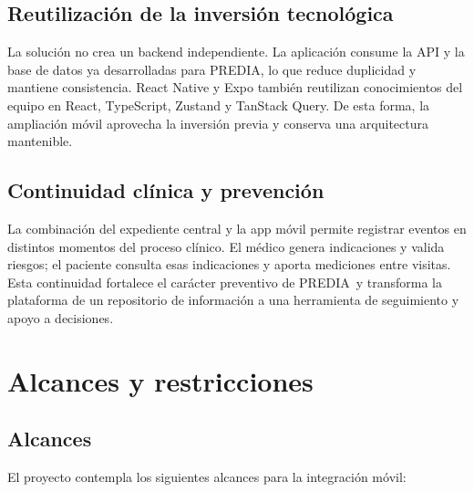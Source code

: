\documentclass[12pt,letterpaper]{report}
\newcommand{\projectname}{PREDIA}
\begin{document}
\subsection{Reutilización de la inversión tecnológica}

La solución no crea un backend independiente. La aplicación consume la API y la base de datos ya desarrolladas para \projectname, lo que reduce duplicidad y mantiene consistencia. React Native y Expo también reutilizan conocimientos del equipo en React, TypeScript, Zustand y TanStack Query. De esta forma, la ampliación móvil aprovecha la inversión previa y conserva una arquitectura mantenible.

\subsection{Continuidad clínica y prevención}

La combinación del expediente central y la app móvil permite registrar eventos en distintos momentos del proceso clínico. El médico genera indicaciones y valida riesgos; el paciente consulta esas indicaciones y aporta mediciones entre visitas. Esta continuidad fortalece el carácter preventivo de \projectname\ y transforma la plataforma de un repositorio de información a una herramienta de seguimiento y apoyo a decisiones.

\section{Alcances y restricciones}

\subsection{Alcances}

El proyecto contempla los siguientes alcances para la integración móvil:
\end{document}
